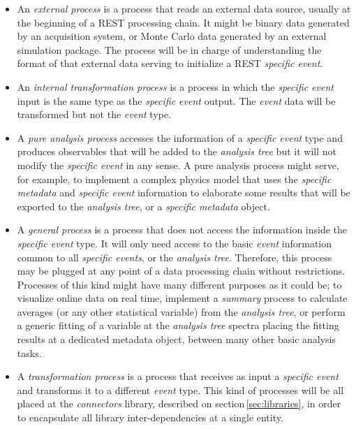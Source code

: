 \begin{itemize}
\item An \emph{external process} is a process that reads an external data source, usually at the beginning of a REST processing chain. It might be binary data generated by an acquisition system, or Monte Carlo data generated by an external simulation package. The process will be in charge of understanding the format of that external data serving to initialize a REST \emph{specific event}.

\item An \emph{internal transformation process} is a process in which the \emph{specific event} input is the same type as the \emph{specific event} output. The \emph{event} data will be transformed but not the \emph{event} type.

\item A \emph{pure analysis process} accesses the information of a \emph{specific event} type and produces observables that will be added to the \emph{analysis tree} but it will not modify the \emph{specific event} in any sense. A pure analysis process might serve, for example, to implement a complex physics model that uses the \emph{specific metadata} and \emph{specific event} information to elaborate some results that will be exported to the \emph{analysis tree}, or a \emph{specific metadata} object.

\item A \emph{general process} is a process that does not access the information inside the \emph{specific event} type. It will only need access to the basic \emph{event} information common to all \emph{specific events}, or the \emph{analysis tree}. Therefore, this process may be plugged at any point of a data processing chain without restrictions. Processes of this kind might have many different purposes as it could be; to visualize online data on real time, implement a \emph{summary} process to calculate averages (or any other statistical variable) from the \emph{analysis tree}, or perform a generic fitting of a variable at the \emph{analysis tree} spectra placing the fitting results at a dedicated metadata object, between many other basic analysis tasks.

\item A \emph{transformation process} is a process that receives as input a \emph{specific event} and transforms it to a different \emph{event} type. This kind of processes will be all placed at the \emph{connectors} library, described on section\,\ref{sec:libraries}, in order to encapsulate all library inter-dependencies at a single entity. 
\end{itemize}

